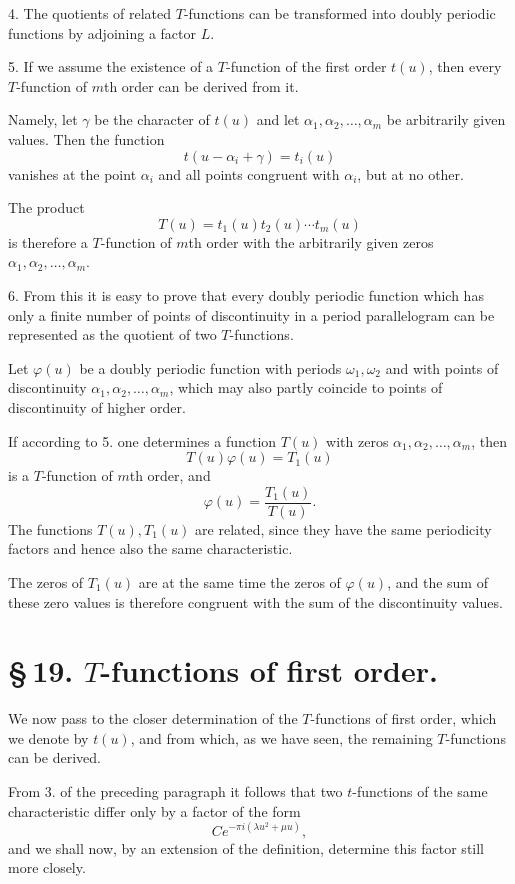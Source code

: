 \documentclass[11pt]{article}
\begin{document}
4. The quotients of related $T$-functions can be transformed into doubly periodic functions by adjoining a factor $L$.

5. If we assume the existence of a $T$-function of the first order $t(u)$, then every $T$-function of $m$th order can be derived from it.

Namely, let $\gamma$ be the character of $t(u)$ and let $\alpha_1,\alpha_2,\ldots,\alpha_m$ be arbitrarily given values. Then the function
\[
t(u-\alpha_i+\gamma)=t_i(u)
\]
vanishes at the point $\alpha_i$ and all points congruent with $\alpha_i$, but at no other.

The product
\[
T(u)=t_1(u)t_2(u)\cdots t_m(u)
\]
is therefore a $T$-function of $m$th order with the arbitrarily given zeros $\alpha_1,\alpha_2,\ldots,\alpha_m$.

6. From this it is easy to prove that every doubly periodic function which has only a finite number of points of discontinuity in a period parallelogram can be represented as the quotient of two $T$-functions.

Let $\varphi(u)$ be a doubly periodic function with periods $\omega_1,\omega_2$ and with points of discontinuity $\alpha_1,\alpha_2,\ldots,\alpha_m$, which may also partly coincide to points of discontinuity of higher order.

If according to 5. one determines a function $T(u)$ with zeros $\alpha_1,\alpha_2,\ldots,\alpha_m$, then
\[
T(u)\varphi(u)=T_1(u)
\]
is a $T$-function of $m$th order, and
\[
\varphi(u)=\frac{T_1(u)}{T(u)}.
\]
The functions $T(u),T_1(u)$ are related, since they have the same periodicity factors and hence also the same characteristic.

The zeros of $T_1(u)$ are at the same time the zeros of $\varphi(u)$, and the sum of these zero values is therefore congruent with the sum of the discontinuity values.

\section*{\S\,19. $T$-functions of first order.}

We now pass to the closer determination of the $T$-functions of first order, which we denote by $t(u)$, and from which, as we have seen, the remaining $T$-functions can be derived.

From 3. of the preceding paragraph it follows that two $t$-functions of the same characteristic differ only by a factor of the form
\[
Ce^{-\pi i(\lambda u^2+\mu u)},
\]
and we shall now, by an extension of the definition, determine this factor still more closely.
\end{document}
